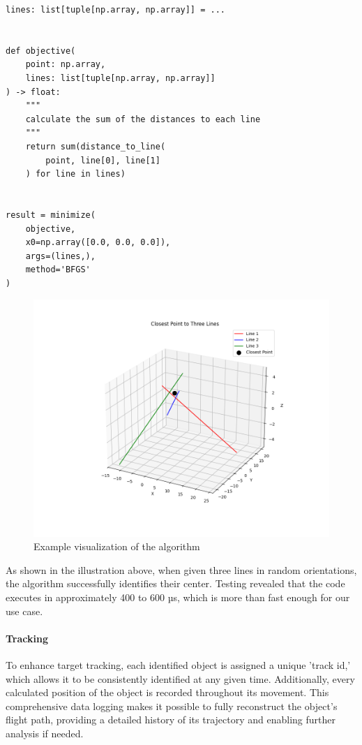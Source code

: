 \hspace*{-1.2cm}

\begin{lstlisting}[caption={Example of 3D Angle Calculation}, label={lst:exampleCalculation}, style=PythonStyle]
lines: list[tuple[np.array, np.array]] = ...


def objective(
	point: np.array,
	lines: list[tuple[np.array, np.array]]
) -> float:
	"""
	calculate the sum of the distances to each line
	"""
	return sum(distance_to_line(
		point, line[0], line[1]
	) for line in lines)


result = minimize(
	objective,
	x0=np.array([0.0, 0.0, 0.0]),
	args=(lines,),
	method='BFGS'
)
\end{lstlisting}

\begin{figure}[H]
	\centering
	\hspace*{-1.5cm} 
	\includegraphics[width=400pt]{figures/approximation_algorithm}
	\caption{Example visualization of the algorithm}
	\label{fig:approximationalgorithm}
\end{figure}

As shown in the illustration above, when given three lines in random orientations, the algorithm successfully identifies their center. Testing revealed that the code executes in approximately 400 to 600 µs, which is more than fast enough for our use case.

\paragraph{Tracking}
To enhance target tracking, each identified object is assigned a unique 'track \acrshort{id},' which allows it to be consistently identified at any given time. Additionally, every calculated position of the object is recorded throughout its movement. This comprehensive data logging makes it possible to fully reconstruct the object's flight path, providing a detailed history of its trajectory and enabling further analysis if needed.

